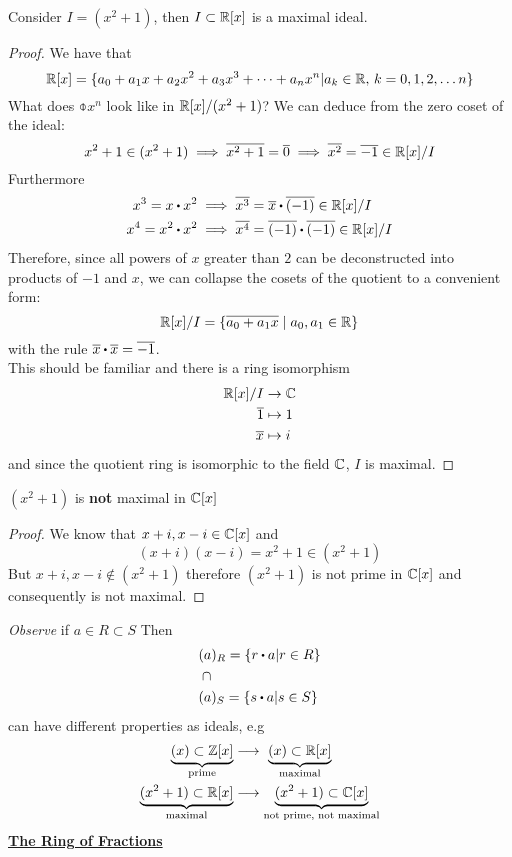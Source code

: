 \documentclass[../Main.tex]{subfiles}
\begin{document}
\begin{claim}
Consider $I=(x^2+1)$, then $I\subset \mathbb{R}[x]$ is a maximal ideal.
\end{claim}
\begin{proof}
	We have that
	\[\mathbb{R}[x] = \{a_0+a_1x+a_2x^2+a_3x^3+\dots+a_nx^n| a_k\in \mathbb{R}, \, k=0,1,2,\dots n\}\]
	What does $\obar{x^n}$ look like in $\mathbb{R}[x]/(x^2+1)$?
	We can deduce from the zero coset of the ideal:
		\[x^2+1 \in (x^2+1) \implies \overline{x^2+1} = \overline{0} \implies \overline{x^2} = \overline{-1} \in \mathbb{R}[x]/I \]
	Furthermore
		\begin{align*}
		x^3 = x\rdot x^2 &\implies \obar{x^3} = \obar{x} \rdot \obar{(-1)} \in \R[x]/I\\
		x^4= x^2\rdot x^2 &\implies \obar{x^4} = \obar{(-1)} \rdot  \obar{(-1)} \in \R[x]/I
	\end{align*}
	Therefore, since all powers of $x$ greater than $2$ can be deconstructed into products of $-1$ and $x$, we can collapse the cosets of the quotient to a convenient form:
	\[\mathbb{R}[x]/I = \{\overline{a_0+a_1x}\mid a_0,a_1\in \mathbb{R}\} \]
	with the rule $\obar{x}\rdot \obar{x}=\obar{-1}$.\\
	This should be familiar and there is a ring isomorphism
	\begin{align*}
	\mathbb{R}[x]/I &\to \mathbb{C} \\
	\overline{1} &\mapsto 1 \\
	\overline{x} &\mapsto i
	\end{align*}
	and since the quotient ring is isomorphic to the field $\mathbb{C}$, $I$ is maximal.
\end{proof}
\begin{claim}
	$(x^2+1)$ is \textbf{not} maximal in $\mathbb{C}[x]$
\end{claim}
\begin{proof}
	We know that $x+i,x-i \in \mathbb{C}[x]$ and
	\[(x+i)(x-i)=x^2+1\in (x^2+1)\]
	But $x+i,x-i \notin (x^2+1)$ therefore $(x^2+1)$ is not prime in $\mathbb{C}[x]$ and consequently is not maximal.
\end{proof}
\textit{Observe} if $a\in R\subset S$ Then
\begin{align*}
(a&)_R = \{r\rdot a | r\in R\}\\
\cap&\\
(a&)_S=\{s\rdot a|s\in S\}
\end{align*}
can have different properties as ideals, e.g
\begin{align*}
\underbrace{(x)\subset \mathbb{Z}[x]}_{\text{prime}} &\longrightarrow \,\,\underbrace{(x) \subset \mathbb{R}[x]}_{\text{maximal}}
\\
\underbrace{(x^2+1)\subset \mathbb{R}[x]}_{\text{maximal}} &\longrightarrow \underbrace{(x^2+1) \subset \mathbb{C}[x]}_{\text{not prime, not maximal}}
\end{align*}\newpage
\underline{\textbf{\Large The Ring of Fractions}}
\end{document}
